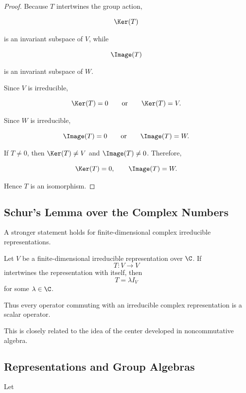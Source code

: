 \begin{proof}
Because \(T\) intertwines the group action,

\[ \Ker(T) \]

is an invariant subspace of \(V\), while

\[ \Image(T) \]

is an invariant subspace of \(W\).

Since \(V\) is irreducible,

\[ \Ker(T)=0\qquad\text{or}\qquad\Ker(T)=V. \]

Since \(W\) is irreducible,

\[ \Image(T)=0\qquad\text{or}\qquad\Image(T)=W. \]

If \(T\neq0\), then \(\Ker(T)\neq V\) and \(\Image(T)\neq0\). Therefore,

\[ \Ker(T)=0,\qquad\Image(T)=W. \]

Hence \(T\) is an isomorphism.
\end{proof}

\subsection{Schur's Lemma over the Complex Numbers}
\label{subsec:schur-complex}

A stronger statement holds for finite-dimensional complex irreducible
representations.

\begin{theorem}
Let \(V\) be a finite-dimensional irreducible representation over \(\C\).
If
\[ T:V\to V \]
intertwines the representation with itself, then
\[ T=\lambda I_V \]
for some \(\lambda\in\C\).
\end{theorem}

Thus every operator commuting with an irreducible complex representation is
a scalar operator.

This is closely related to the idea of the center developed in
noncommutative algebra.

\subsection{Representations and Group Algebras}
\label{subsec:representations-group-algebras}

Let

